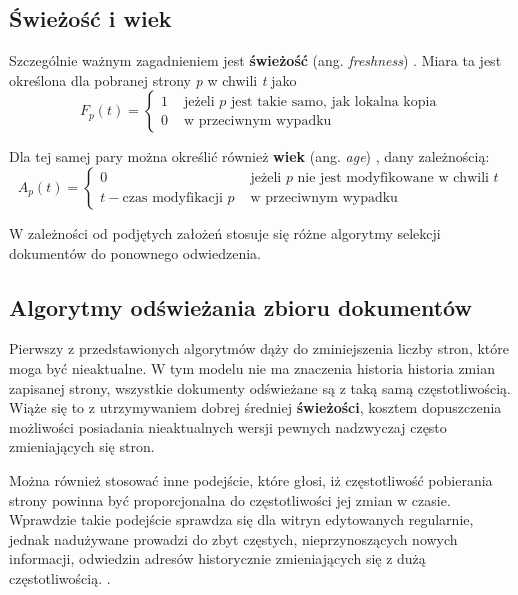 \subsection{Świeżość i wiek}
\label{subsec:swiezoscWiek}
Szczególnie ważnym zagadnieniem jest \textbf{świeżość} (ang. \emph{freshness}) \cite{webMining,webCrawling}. Miara ta jest określona dla pobranej strony \emph{p} w chwili \emph{t} jako
    \begin{equation}
        F_p(t) = 
        \begin{cases}
            1 &\text{  jeżeli } p\text{ jest takie samo, jak lokalna kopia}\\
            0 &\text{ w przeciwnym wypadku}
        \end{cases}
    \end{equation}

Dla tej samej pary można określić również \textbf{wiek} (ang. \emph{age}) \cite{webCrawling}, dany zależnością:
\begin{equation}
        A_p(t) = 
        \begin{cases}
            0 &\text{  jeżeli } p\text{ nie jest modyfikowane w chwili }t\\
            t - \text{czas modyfikacji } p &\text{ w przeciwnym wypadku}
        \end{cases}
    \end{equation}
    
W zależności od podjętych założeń stosuje się różne algorytmy selekcji dokumentów do ponownego odwiedzenia.



\subsection{Algorytmy odświeżania zbioru dokumentów}
\label{sec:odswStron}

Pierwszy z przedstawionych algorytmów dąży do zminiejszenia liczby stron, które moga być nieaktualne. W tym modelu nie ma znaczenia historia historia
zmian zapisanej strony, wszystkie dokumenty odświeżane są z taką samą częstotliwością. Wiąże się to z utrzymywaniem dobrej średniej \textbf{świeżości},
\cite{freshAge} kosztem dopuszczenia możliwości posiadania nieaktualnych wersji pewnych nadzwyczaj często zmieniających się stron. 

Można również stosować inne podejście, które głosi, iż częstotliwość pobierania strony powinna być proporcjonalna do częstotliwości jej zmian w czasie.
Wprawdzie takie podejście sprawdza się dla witryn edytowanych regularnie, jednak nadużywane prowadzi do zbyt częstych, nieprzynoszących nowych informacji, 
odwiedzin adresów historycznie zmieniających się z dużą częstotliwością. \cite{freshAge}.

